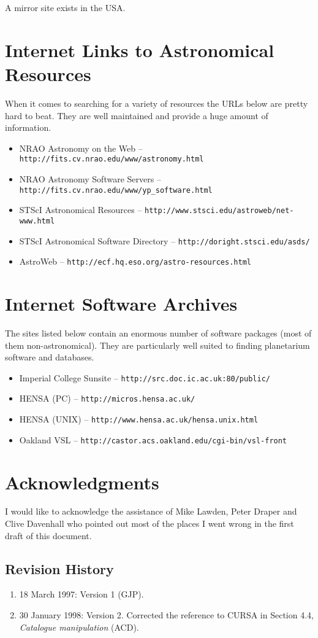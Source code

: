 \documentclass[twoside,11pt]{article}
\newcommand{\htmladdnormallink}[2]{#1}
\newcommand{\xlabel}[1]{}
\newcommand{\HTTPWref}{\htmladdnormallink{\tt http://fits.cv.nrao.edu/www/astronomy.html}{http://fits.cv.nrao.edu/www/astronomy.html}}
\newcommand{\HTTPXref}{\htmladdnormallink{\tt http://www.stsci.edu/astroweb/net-www.html}{http://www.stsci.edu/astroweb/net-www.html}}
\newcommand{\HTTPYref}{\htmladdnormallink{\tt http://fits.cv.nrao.edu/www/yp\_{}software.html}{http://fits.cv.nrao.edu/www/yp\_{}software.html}}
\newcommand{\HTTPZref}{\htmladdnormallink{\tt http://doright.stsci.edu/asds/}{http://doright.stsci.edu/asds/}}
\newcommand{\HTTPAAref}{\htmladdnormallink{\tt http://src.doc.ic.ac.uk:80/public/}{http://src.doc.ic.ac.uk:80/public/}}
\newcommand{\HTTPABref}{\htmladdnormallink{\tt http://micros.hensa.ac.uk/}{http://micros.hensa.ac.uk/}}
\newcommand{\HTTPACref}{\htmladdnormallink{\tt http://www.hensa.ac.uk/hensa.unix.html}{http://www.hensa.ac.uk/hensa.unix.html}}
\newcommand{\HTTPADref}{\htmladdnormallink{\tt http://castor.acs.oakland.edu/cgi-bin/vsl-front}{http://castor.acs.oakland.edu/cgi-bin/vsl-front}}
\newcommand{\HTTPBGref}{\htmladdnormallink{\tt http://ecf.hq.eso.org/astro-resources.html}{http://http://ecf.hq.eso.org/astro-resources.html}}
\begin{document}
A mirror site exists in the USA. 

\section{Internet Links to Astronomical Resources} \xlabel{LINKS}
\label{sec:links}
 
When it comes to searching for a variety of resources the URLs below
are pretty hard to beat. They are well maintained and provide a huge amount
of information. 

\begin{itemize}
\item NRAO  Astronomy on the Web -- {\HTTPWref}               
\item NRAO Astronomy Software Servers -- {\HTTPYref}
\item STScI Astronomical Resources -- {\HTTPXref}          
\item STScI Astronomical Software Directory  -- {\HTTPZref} 
\item AstroWeb -- {\HTTPBGref}
\end{itemize}

\section{Internet Software Archives} \xlabel{GENERAL}
\label{sec:general}
 
The sites listed below contain an enormous number of software packages (most
of them non-astronomical). They are particularly well suited to finding
planetarium software and databases. 

\begin{itemize}
\item Imperial College Sunsite -- {\HTTPAAref}
\item HENSA (PC) -- {\HTTPABref} 
\item HENSA (UNIX) -- {\HTTPACref} 
\item Oakland VSL -- {\HTTPADref} 
\end{itemize}

\section{Acknowledgments} \xlabel{ACK}
\label{sec:ack}

I would like to acknowledge the assistance of Mike Lawden, Peter Draper and 
Clive Davenhall who pointed out most of the places I went wrong 
in the first draft of this document.

\vspace{3cm}

\subsection*{Revision History}

\begin{enumerate}

  \item 18 March 1997: Version 1 (GJP).

  \item 30 January 1998: Version 2.  Corrected the reference to CURSA
   in Section 4.4, {\it Catalogue manipulation\/} (ACD).

\end{enumerate}
\end{document}
